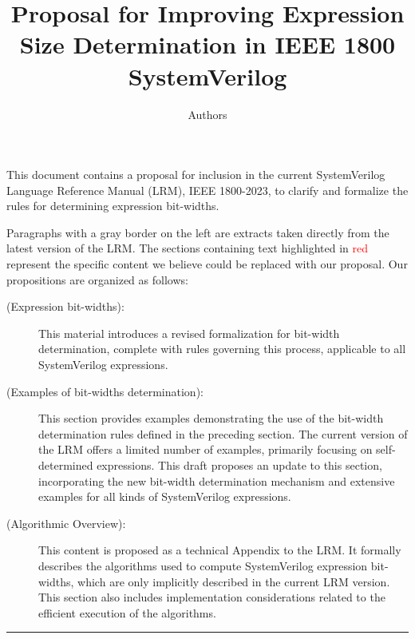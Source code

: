 \documentclass{article}
\title{Proposal for Improving Expression Size Determination in IEEE 1800
  SystemVerilog}
\author{Authors}
\date{}
\begin{document}
\maketitle

This document contains a proposal for inclusion in the current SystemVerilog
Language Reference Manual (LRM), IEEE 1800-2023, to clarify and formalize the
rules for determining expression bit-widths.

Paragraphs with a gray border on the left are extracts taken directly from the
latest version of the LRM. The sections containing text highlighted in
\textcolor{red}{red} represent the specific content we believe could be replaced
with our proposal. Our propositions are organized as follows:

\begin{description}
  \item[ (Expression bit-widths):]
    This material introduces a revised formalization for bit-width
    determination, complete with rules governing this process, applicable to
    all SystemVerilog expressions.

  \item[ (Examples of bit-widths determination):]
    This section provides examples demonstrating the use of the bit-width
    determination rules defined in the preceding section. The current
    version of the LRM offers a limited number of examples, primarily
    focusing on self-determined expressions. This draft proposes an update
    to this section, incorporating the new bit-width determination mechanism
    and extensive examples for all kinds of SystemVerilog expressions.

  \item[ (Algorithmic Overview):]
    This content is proposed as a technical Appendix to the LRM. It formally
    describes the algorithms used to compute SystemVerilog expression
    bit-widths, which are only implicitly described in the current LRM
    version. This section also includes implementation considerations
    related to the efficient execution of the algorithms.
\end{description}

\begin{center}
  \noindent\rule{.8\textwidth}{1pt}
\end{center}

\renewcommand{\thesection}{11.4.\arabic{section}}
\setcounter{section}{3}
\end{document}
